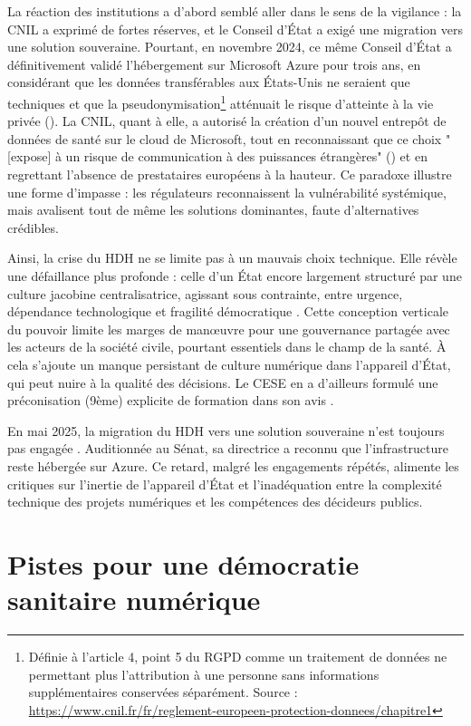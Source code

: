\documentclass[10pt,a4paper]{article}
\begin{document}
La réaction des institutions a d’abord semblé aller dans le sens de la vigilance : la CNIL a exprimé de fortes réserves, et le Conseil d’État a exigé une migration vers une solution souveraine. Pourtant, en novembre 2024, ce même Conseil d’État a définitivement validé l’hébergement sur Microsoft Azure pour trois ans, en considérant que les données transférables aux États-Unis ne seraient que techniques et que la pseudonymisation\footnote{Définie à l’article 4, point 5 du RGPD comme un traitement de données ne permettant plus l’attribution à une personne sans informations supplémentaires conservées séparément. Source : \url{https://www.cnil.fr/fr/reglement-europeen-protection-donnees/chapitre1}} atténuait le risque d’atteinte à la vie privée (\cite{Devillers2024}). La CNIL, quant à elle, a autorisé la création d’un nouvel entrepôt de données de santé sur le cloud de Microsoft, tout en reconnaissant que ce choix "[expose] à un risque de communication à des puissances étrangères" (\cite{cnil2023-146}) et en regrettant l’absence de prestataires européens à la hauteur. Ce paradoxe illustre une forme d’impasse : les régulateurs reconnaissent la vulnérabilité systémique, mais avalisent tout de même les solutions dominantes, faute d’alternatives crédibles.


Ainsi, la crise du HDH ne se limite pas à un mauvais choix technique. Elle révèle une défaillance plus profonde : celle d’un État encore largement structuré par une culture jacobine centralisatrice, agissant sous contrainte, entre urgence, dépendance technologique et fragilité démocratique \parencite{naiditch2024democratie}. Cette conception verticale du pouvoir limite les marges de manœuvre pour une gouvernance partagée avec les acteurs de la société civile, pourtant essentiels dans le champ de la santé. À cela s’ajoute un manque persistant de culture numérique dans l'appareil d'État, qui peut nuire à la qualité des décisions. Le CESE en a d'ailleurs formulé une préconisation (9ème) explicite de formation dans son avis \parencite{duboc2021economie}.

En mai 2025, la migration du HDH vers une solution souveraine n’est toujours pas engagée \parencite{Flechaux2025MigrationHDH}. Auditionnée au Sénat, sa directrice a reconnu que l’infrastructure reste hébergée sur Azure. Ce retard, malgré les engagements répétés, alimente les critiques sur l’inertie de l’appareil d’État et l’inadéquation entre la complexité technique des projets numériques et les compétences des décideurs publics.


\section{Pistes pour une démocratie sanitaire numérique}
\end{document}
